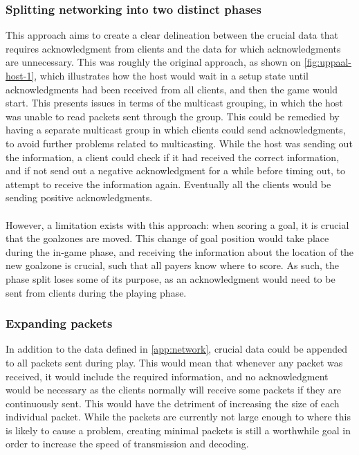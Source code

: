 \subsubsection{Splitting networking into two distinct phases}
This approach aims to create a clear delineation between the crucial data that requires acknowledgment from clients and the data for which acknowledgments are unnecessary.
This was roughly the original approach, as shown on \autoref{fig:uppaal-host-1}, which illustrates how the host would wait in a setup state until acknowledgments had been received from all clients, and then the game would start.
This presents issues in terms of the multicast grouping, in which the host was unable to read packets sent through the group.
This could be remedied by having a separate multicast group in which clients could send acknowledgments, to avoid further problems related to multicasting.
While the host was sending out the information, a client could check if it had received the correct information, and if not send out a negative acknowledgment for a while before timing out, to attempt to receive the information again.
Eventually all the clients would be sending positive acknowledgments.
\\\\
However, a limitation exists with this approach: when scoring a goal, it is crucial that the goalzones are moved.
This change of goal position would take place during the in-game phase, and receiving the information about the location of the new goalzone is crucial, such that all payers know where to score.
As such, the phase split loses some of its purpose, as an acknowledgment would need to be sent from clients during the playing phase.

\subsubsection{Expanding packets}
In addition to the data defined in \autoref{app:network}, crucial data could be appended to all packets sent during play.
This would mean that whenever any packet was received, it would include the required information, and no acknowledgment would be necessary as the clients normally will receive some packets if they are continuously sent.
This would have the detriment of increasing the size of each individual packet.
While the packets are currently not large enough to where this is likely to cause a problem, creating minimal packets is still a worthwhile goal in order to increase the speed of transmission and decoding.

